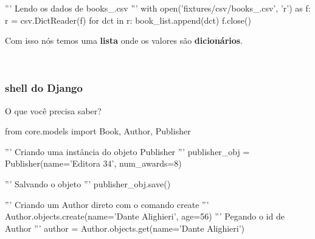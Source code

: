 \documentclass{beamer}
\begin{document}
{\begin{frame}[fragile]
\begin{pythoncode}
''' Lendo os dados de books_.csv '''
with open('fixtures/csv/books_.csv', 'r') as f:
    r = csv.DictReader(f)
    for dct in r:
        book_list.append(dct)
    f.close()
\end{pythoncode}

\end{frame}

\begin{frame}[fragile]
	
Com isso nós temos uma \textbf{lista} onde os valores são \textbf{dicionários}.

\

\begin{bashcode}
\end{bashcode}

\end{frame}


\begin{frame}[fragile]\frametitle{shell do Django}
	

\end{frame}

\begin{frame}[fragile]

O que você precisa saber?

\begin{bashcode}
from core.models import Book, Author, Publisher

''' Criando uma instância do objeto Publisher '''
publisher_obj = Publisher(name='Editora 34',
                          num_awards=8)

''' Salvando o objeto '''
publisher_obj.save()

''' Criando um Author direto com o comando create '''
Author.objects.create(name='Dante Alighieri',
                      age=56)
''' Pegando o id de Author '''
author = Author.objects.get(name='Dante Alighieri')


\end{bashcode}
\end{frame}}
\end{document}
